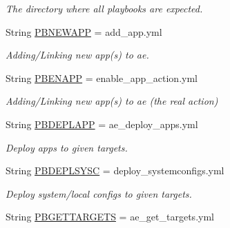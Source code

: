 \begin{DoxyCompactItemize}
\begin{DoxyCompactList}\small\item\em The directory where all playbooks are expected. \end{DoxyCompactList}\item 
\mbox{\label{ansible__engine_8sh_a06cf6d51b3ccc9f90e9865f2566e2d13}} 
String \mbox{\hyperlink{ansible__engine_8sh_a06cf6d51b3ccc9f90e9865f2566e2d13}{P\+B\+N\+E\+W\+A\+PP}} = add\+\_\+app.\+yml
\begin{DoxyCompactList}\small\item\em Adding/\+Linking new app(s) to ae. \end{DoxyCompactList}\item 
\mbox{\label{ansible__engine_8sh_a8c588b65ccd29bf03f0ea2f36124e707}} 
String \mbox{\hyperlink{ansible__engine_8sh_a8c588b65ccd29bf03f0ea2f36124e707}{P\+B\+E\+N\+A\+PP}} = enable\+\_\+app\+\_\+action.\+yml
\begin{DoxyCompactList}\small\item\em Adding/\+Linking new app(s) to ae (the real action) \end{DoxyCompactList}\item 
\mbox{\label{ansible__engine_8sh_a04d2a765ad48aee391ce970589657845}} 
String \mbox{\hyperlink{ansible__engine_8sh_a04d2a765ad48aee391ce970589657845}{P\+B\+D\+E\+P\+L\+A\+PP}} = ae\+\_\+deploy\+\_\+apps.\+yml
\begin{DoxyCompactList}\small\item\em Deploy apps to given targets. \end{DoxyCompactList}\item 
\mbox{\label{ansible__engine_8sh_a4f304baa81ee66cb0098e1a9973d7145}} 
String \mbox{\hyperlink{ansible__engine_8sh_a4f304baa81ee66cb0098e1a9973d7145}{P\+B\+D\+E\+P\+L\+S\+Y\+SC}} = deploy\+\_\+systemconfigs.\+yml
\begin{DoxyCompactList}\small\item\em Deploy system/local configs to given targets. \end{DoxyCompactList}\item 
\mbox{\label{ansible__engine_8sh_a55bcb5c8a394dd5d538f5f406af77df8}} 
String \mbox{\hyperlink{ansible__engine_8sh_a55bcb5c8a394dd5d538f5f406af77df8}{P\+B\+G\+E\+T\+T\+A\+R\+G\+E\+TS}} = ae\+\_\+get\+\_\+targets.\+yml

\end{DoxyCompactItemize}
